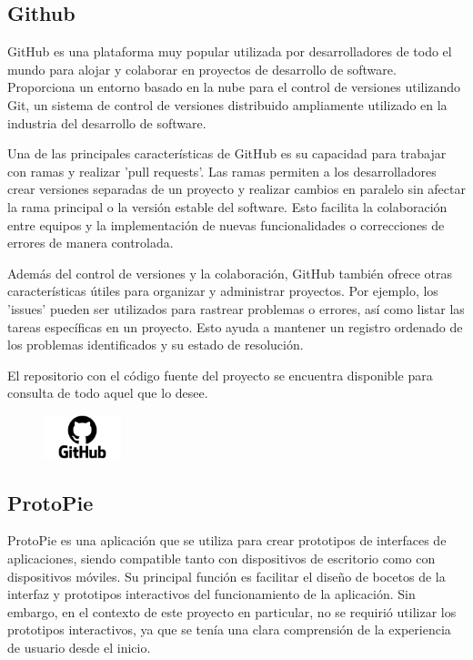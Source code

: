 \documentclass{article}
\begin{document}
\subsection{Github}

GitHub es una plataforma muy popular utilizada por desarrolladores de todo el mundo para alojar y colaborar en proyectos de desarrollo de software. Proporciona un entorno basado en la nube para el control de versiones utilizando Git, un sistema de control de versiones distribuido ampliamente utilizado en la industria del desarrollo de software.

Una de las principales características de GitHub es su capacidad para trabajar con ramas y realizar 'pull requests'. Las ramas permiten a los desarrolladores crear versiones separadas de un proyecto y realizar cambios en paralelo sin afectar la rama principal o la versión estable del software. Esto facilita la colaboración entre equipos y la implementación de nuevas funcionalidades o correcciones de errores de manera controlada.

Además del control de versiones y la colaboración, GitHub también ofrece otras características útiles para organizar y administrar proyectos. Por ejemplo, los 'issues' pueden ser utilizados para rastrear problemas o errores, así como listar las tareas específicas en un proyecto. Esto ayuda a mantener un registro ordenado de los problemas identificados y su estado de resolución.

El repositorio con el código fuente del proyecto \cite{repo} se encuentra disponible para consulta de todo aquel que lo desee. 

\begin{figure}[h]
    \centering
    \includegraphics[width=0.2\textwidth]{imagenes/logos/logo_github.png}
\end{figure}

\subsection{ProtoPie}

ProtoPie es una aplicación que se utiliza para crear prototipos de interfaces de aplicaciones, siendo compatible tanto con dispositivos de escritorio como con dispositivos móviles. Su principal función es facilitar el diseño de bocetos de la interfaz y prototipos interactivos del funcionamiento de la aplicación. Sin embargo, en el contexto de este proyecto en particular, no se requirió utilizar los prototipos interactivos, ya que se tenía una clara comprensión de la experiencia de usuario desde el inicio.
\end{document}
